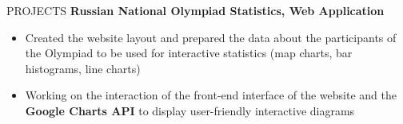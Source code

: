 \documentclass{resume} %
\begin{document}
\begin{rSection}{PROJECTS}
\textbf{Russian National Olympiad Statistics, Web Application}  %
\begin{itemize}
    \item Created the website layout and prepared the data about the participants of the Olympiad to be used for interactive statistics (map charts, bar histograms, line charts)
    \item Working on the interaction of the front-end interface of the website and the \textbf{Google Charts API} to display user-friendly interactive diagrams
\end{itemize}


\end{rSection}
\end{document}
